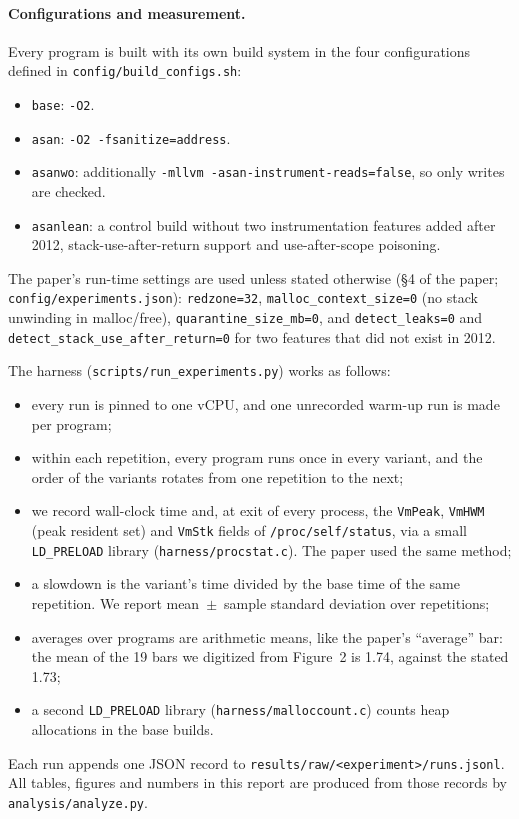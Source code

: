 \documentclass[10pt,a4paper]{article}
\newcommand{\cmd}[1]{\texttt{#1}}
\begin{document}
\paragraph{Configurations and measurement.}
Every program is built with its own build system in the four
configurations defined in \cmd{config/build_configs.sh}:
\begin{itemize}
\item \cmd{base}: \cmd{-O2}.
\item \cmd{asan}: \cmd{-O2 -fsanitize=address}.
\item \cmd{asanwo}: additionally \cmd{-mllvm -asan-instrument-reads=false},
so only writes are checked.
\item \cmd{asanlean}: a control build without two instrumentation features
added after 2012, stack-use-after-return support and use-after-scope
poisoning.
\end{itemize}
The paper's run-time settings are used unless stated otherwise (\S4 of the
paper; \cmd{config/experiments.json}): \cmd{redzone=32},
\cmd{malloc\_context\_size=0} (no stack unwinding in malloc/free),
\cmd{quarantine\_size\_mb=0}, and \cmd{detect\_leaks=0} and
\cmd{detect\_stack\_use\_after\_return=0} for two features that did not exist
in 2012.

The harness (\cmd{scripts/run_experiments.py}) works as follows:
\begin{itemize}
\item every run is pinned to one vCPU, and one unrecorded warm-up run is made
per program;
\item within each repetition, every program runs once in every variant, and
the order of the variants rotates from one repetition to the next;
\item we record wall-clock time and, at exit of every process, the
\cmd{VmPeak}, \cmd{VmHWM} (peak resident set) and \cmd{VmStk} fields of
\cmd{/proc/self/status}, via a small \cmd{LD\_PRELOAD} library
(\cmd{harness/procstat.c}). The paper used the same method;
\item a slowdown is the variant's time divided by the base time of the same
repetition. We report mean~$\pm$~sample standard deviation over repetitions;
\item averages over programs are arithmetic means, like the paper's
``average'' bar: the mean of the 19 bars we digitized from Figure~2 is 1.74,
against the stated 1.73;
\item a second \cmd{LD\_PRELOAD} library (\cmd{harness/malloccount.c}) counts
heap allocations in the base builds.
\end{itemize}
Each run appends one JSON record to \cmd{results/raw/<experiment>/runs.jsonl}.
All tables, figures and numbers in this report are produced from those records
by \cmd{analysis/analyze.py}.
\end{document}
